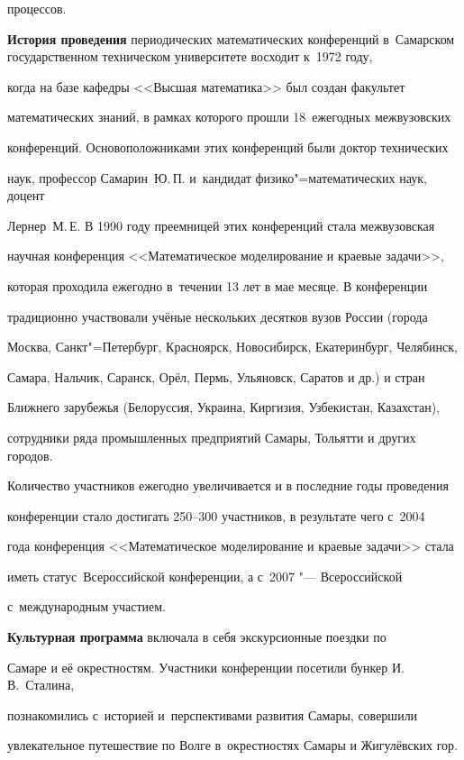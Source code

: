 процессов.



\textbf{История проведения} периодических математических конференций в~Самарском государственном техническом университете восходит к~1972 году, 

когда на базе кафедры <<Высшая математика>> был создан факультет 

математических знаний, в рамках которого прошли 18~ежегодных межвузовских 

конференций. Основоположниками этих конференций были доктор технических 

наук, профессор Самарин~Ю.\,П. и~кандидат физико"=математических наук, доцент 

Лернер~М.\,Е. В 1990 году преемницей этих конференций стала межвузовская 

научная конференция <<Математическое моделирование и краевые задачи>>, 

которая проходила ежегодно в~течении 13 лет в мае месяце. В конференции 

традиционно участвовали учёные нескольких десятков вузов России (города 

Москва, Санкт"=Петербург, Красноярск, Новосибирск, Екатеринбург, Челябинск, 

Самара, Нальчик, Саранск, Орёл, Пермь, Ульяновск, Саратов и др.) и стран 

Ближнего зарубежья (Белоруссия, Украина, Киргизия, Узбекистан, Казахстан), 

сотрудники ряда промышленных предприятий Самары, Тольятти и других городов. 

Количество участников ежегодно увеличивается и в последние годы проведения 

конференции стало достигать 250--300 участников, в результате чего с~2004 

года конференция <<Математическое моделирование и краевые задачи>> стала 

иметь статус~Всероссийской конференции, а с~2007 "--- Всероссийской 

с~международным участием.



\textbf{Культурная программа} включала в себя экскурсионные поездки по 

Самаре и её окрестностям. Участники конференции посетили бункер И.\,В.~Сталина, 

познакомились с~историей и~перспективами развития Самары, совершили 

увлекательное путешествие по Волге в~окрестностях Самары и Жигулёвских гор.



